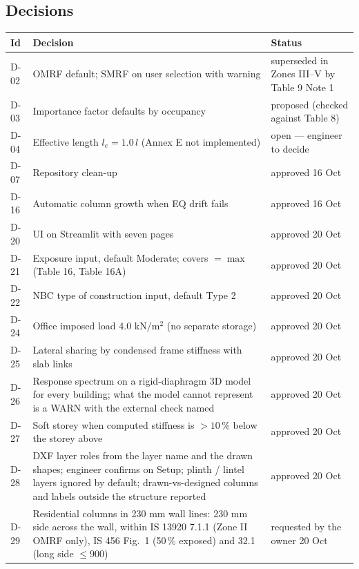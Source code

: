 \documentclass[10pt,a4paper]{article}
\begin{document}
\subsection{Decisions}
\begin{longtable}{L{12mm}L{114mm}L{34mm}}
\toprule \textbf{Id} & \textbf{Decision} & \textbf{Status} \\ \midrule \endhead
D-02 & OMRF default; SMRF on user selection with warning & superseded in Zones III--V by Table 9 Note 1 \\
D-03 & Importance factor defaults by occupancy & proposed (checked against Table 8) \\
D-04 & Effective length $l_e = 1.0\,l$ (Annex E not implemented) & open --- engineer to decide \\
D-07 & Repository clean-up & approved 16 Oct \\
D-16 & Automatic column growth when EQ drift fails & approved 16 Oct \\
D-20 & UI on Streamlit with seven pages & approved 20 Oct \\
D-21 & Exposure input, default Moderate; covers $=\max$(Table 16, Table 16A) & approved 20 Oct \\
D-22 & NBC type of construction input, default Type 2 & approved 20 Oct \\
D-24 & Office imposed load 4.0 kN/m$^2$ (no separate storage) & approved 20 Oct \\
D-25 & Lateral sharing by condensed frame stiffness with slab links & approved 20 Oct \\
D-26 & Response spectrum on a rigid-diaphragm 3D model for every building; what the model cannot represent is a WARN
with the external check named & approved 20 Oct \\
D-27 & Soft storey when computed stiffness is $>10\,\%$ below the storey above & approved 20 Oct \\
D-28 & DXF layer roles from the layer name and the drawn shapes; engineer confirms on Setup; plinth / lintel layers
ignored by default; drawn-vs-designed columns and labels outside the structure reported & approved 20 Oct \\
D-29 & Residential columns in 230 mm wall lines: 230 mm side across the wall, within IS 13920 7.1.1 (Zone II OMRF only),
IS 456 Fig.~1 (50\,\% exposed) and 32.1 (long side $\le900$) & requested by the owner 20 Oct \\
\bottomrule
\end{longtable}

\end{document}
